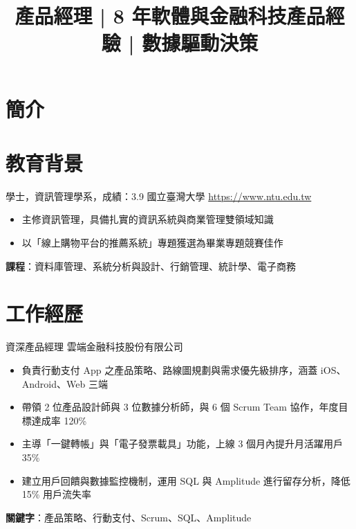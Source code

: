 \documentclass[a4paper, serif, 10pt]{moderncv}
\title{產品經理 | 8 年軟體與金融科技產品經驗 | 數據驅動決策}
\begin{document}
\maketitle

\section{簡介}

\section{教育背景}

        {學士，資訊管理學系，成績：3.9}
        {國立臺灣大學}
        {\url{https://www.ntu.edu.tw}}
        {}
        {\begin{itemize}
\item 主修資訊管理，具備扎實的資訊系統與商業管理雙領域知識
\item 以「線上購物平台的推薦系統」專題獲選為畢業專題競賽佳作
\end{itemize}
\textbf{課程}：資料庫管理、系統分析與設計、行銷管理、統計學、電子商務}
\section{工作經歷}

        {資深產品經理}
        {雲端金融科技股份有限公司}
        {}
        {}
        {\begin{itemize}
\item 負責行動支付 App 之產品策略、路線圖規劃與需求優先級排序，涵蓋 iOS、Android、Web 三端
\item 帶領 2 位產品設計師與 3 位數據分析師，與 6 個 Scrum Team 協作，年度目標達成率 120\%
\item 主導「一鍵轉帳」與「電子發票載具」功能，上線 3 個月內提升月活躍用戶 35\%
\item 建立用戶回饋與數據監控機制，運用 SQL 與 Amplitude 進行留存分析，降低 15\% 用戶流失率
\end{itemize}
\textbf{關鍵字}：產品策略、行動支付、Scrum、SQL、Amplitude}
\end{document}
